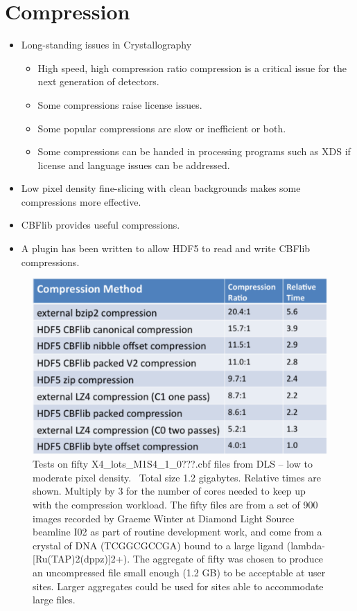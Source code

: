 \documentclass[11pt]{a0poster}
\begin{document}
\begin{minipage}[]{0.29\linewidth}
\section*{Compression}
\fontsize{18}{22}\selectfont %
\begin{itemize}
\item{Long-standing issues in Crystallography
\begin{itemize}
\item{High speed, high compression ratio compression is a critical issue for the next generation of detectors.}
\item{Some compressions raise license issues.} 
\item{Some popular compressions are slow or inefficient or both.}
\item{Some compressions can be handed in processing programs such as XDS if license and language issues can be addressed.}
\end{itemize}}
\item{Low pixel density fine-slicing with clean backgrounds makes some compressions more effective.}
\item{CBFlib provides useful compressions.}
\item{A plugin has been written to allow HDF5 to read and write CBFlib compressions.}
\end{itemize}

\begin{figure}[H]
\begin{center}
\includegraphics[width=200mm]{Compression_50}
\caption{\fontsize{18}{22}\selectfont%
Tests on fifty X4\_lots\_M1S4\_1\_0???.cbf files from DLS – low to moderate pixel density.   Total size 1.2 gigabytes.  Relative times are shown.  Multiply by 3 for the number of cores needed
to keep up with the compression workload.  The fifty files are from a set of 900 images recorded by Graeme Winter at 
Diamond Light Source beamline I02 as part of routine development work, and come from a crystal of DNA
(TCGGCGCCGA) bound to a large ligand (lambda-[Ru(TAP)2(dppz)]2+).  The aggregate of fifty was chosen
to produce an uncompressed file small enough (1.2 GB) to be acceptable at user sites.  Larger aggregates could
be used for sites able to accommodate large files.}
\label{Compression}
\end{center}
\end{figure}




\end{minipage}
\end{document}
